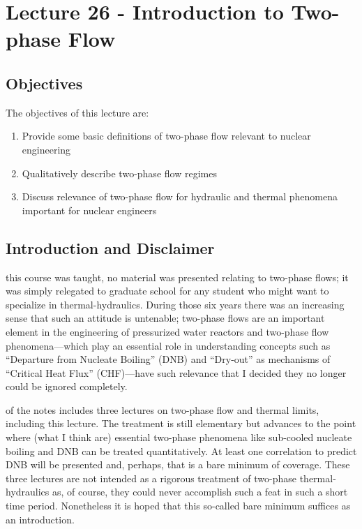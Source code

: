 \chapter{Lecture 26 - Introduction to Two-phase Flow}
\label{ch:ch26}
\section{Objectives}
The objectives of this lecture are:
\begin{enumerate}
\item Provide some basic definitions of two-phase flow relevant to nuclear engineering
\item Qualitatively describe two-phase flow regimes
\item Discuss relevance of two-phase flow for hydraulic and thermal phenomena important for nuclear engineers
\end{enumerate}

\section{Introduction and Disclaimer}
 this course was taught, no material was presented relating to two-phase flows; it was simply relegated to graduate school for any student who might want to specialize in thermal-hydraulics.  During those six years there was an increasing sense that such an attitude is untenable; two-phase flows are an important element in the engineering of pressurized water reactors and two-phase flow phenomena---which play an essential role in understanding concepts such as ``Departure from Nucleate Boiling'' (DNB) and ``Dry-out'' as mechanisms of ``Critical Heat Flux'' (CHF)---have such relevance that I decided they no longer could be ignored completely.  

 of the notes includes three lectures on two-phase flow and thermal limits, including this lecture.  The treatment is still elementary but advances to the point where (what I think are) essential two-phase phenomena like sub-cooled nucleate boiling and DNB can be treated quantitatively.  At least one correlation to predict DNB will be presented and, perhaps, that is a bare minimum of coverage.  These three lectures are not intended as a rigorous treatment of two-phase thermal-hydraulics as, of course, they could never accomplish such a feat in such a short time period.  Nonetheless it is hoped that this so-called bare minimum suffices as an introduction.


